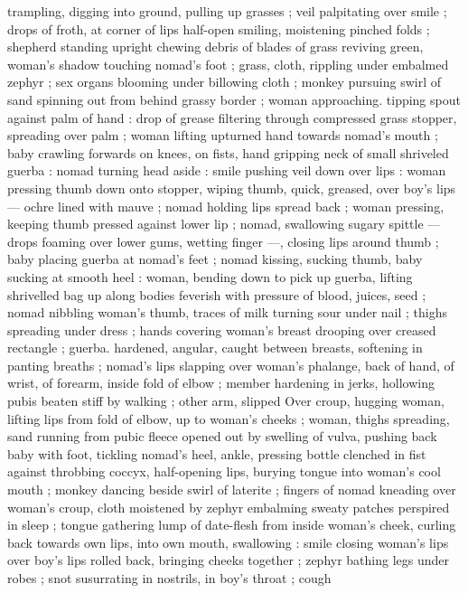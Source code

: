 trampling, digging into ground, pulling up grasses ; veil palpitating 
over smile ; drops of froth, at corner of lips half-open smiling, 
moistening pinched folds ; shepherd standing upright chewing debris 
of blades of grass reviving green, woman's shadow touching 
nomad's foot ; grass, cloth, rippling under embalmed zephyr ; sex 
organs blooming under billowing cloth ; monkey pursuing swirl of 
sand spinning out from behind grassy border ; woman approaching. 
tipping spout against palm of hand : drop of grease filtering through 
compressed grass stopper, spreading over palm ; woman lifting 
upturned hand towards nomad's mouth ; baby crawling forwards on 
knees, on fists, hand gripping neck of small shriveled guerba : 
nomad turning head aside : smile pushing veil down over lips : 
woman pressing thumb down onto stopper, wiping thumb, quick, 
greased, over boy's lips --- ochre lined with mauve ; nomad holding 
lips spread back ; woman pressing, keeping thumb pressed against 
lower lip ; nomad, swallowing sugary spittle --- drops foaming over 
lower gums, wetting finger ---, closing lips around thumb ; baby 
placing guerba at nomad's feet ; nomad kissing, sucking thumb, baby 
sucking at smooth heel : woman, bending down to pick up guerba, 
lifting shrivelled bag up along bodies feverish with pressure of 
blood, juices, seed ; nomad nibbling woman's thumb, traces of milk 
turning sour under nail ; thighs spreading under dress ; hands 
covering woman's breast drooping over creased rectangle ; guerba. 
hardened, angular, caught between breasts, softening in panting 
breaths ; nomad's lips slapping over woman's phalange, back of 
hand, of wrist, of forearm, inside fold of elbow ; member hardening 
in jerks, hollowing pubis beaten stiff by walking ; other arm, slipped 
Over croup, hugging woman, lifting lips from fold of elbow, up to 
woman's cheeks ; woman, thighs spreading, sand running from pubic 
fleece opened out by swelling of vulva, pushing back baby with foot, 
tickling nomad's heel, ankle, pressing bottle clenched in fist against 
throbbing coccyx, half-opening lips, burying tongue into woman's 
cool mouth ; monkey dancing beside swirl of laterite ; fingers of 
nomad kneading over woman's croup, cloth moistened by zephyr 
embalming sweaty patches perspired in sleep ; tongue gathering 
lump of date-flesh from inside woman's cheek, curling back towards 
own lips, into own mouth, swallowing : smile closing woman's lips 
over boy's lips rolled back, bringing cheeks together ; zephyr bathing 
legs under robes ; snot susurrating in nostrils, in boy's throat ; cough 
